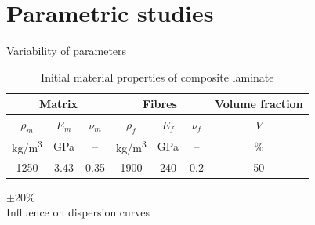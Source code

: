 \documentclass[10pt]{beamer} %
\begin{document}
\section{Parametric studies}
\begin{frame}[t,label=frame16]{Variability of parameters}
\begin{table}
	\label{tab:mat_prop}
	\renewcommand{\arraystretch}{1.1}
	\centering \footnotesize
	\caption{Initial material properties of composite laminate}
	\begin{tabular}{ccccccc} 
		\toprule
		\multicolumn{3}{c}{\textbf{Matrix} }	& \multicolumn{3}{c}{\textbf{Fibres} } & \textbf{Volume fraction}	 \\ 
		\midrule
		$\rho_m$ & $E_m$ & $\nu_m$  & $\rho_f$ & $E_f$ & $\nu_f$ & $V$\\
		kg/m\textsuperscript{3} &GPa& --  & kg/m\textsuperscript{3}  & GPa& -- & \%\\ 
		\cmidrule(lr){1-3} \cmidrule(lr){4-6} \cmidrule(lr){7-7}
		1250 &3.43& 0.35& 1900 & 240 & 0.2 & 50\\
		\bottomrule 
	\end{tabular} 
\end{table}
\vspace{10pt}
\centering
\Large $\pm$20\%\\ 
\vspace{10pt}
\normalsize Influence on dispersion curves
\end{frame}
\end{document}
